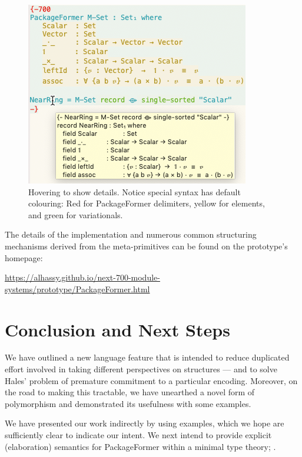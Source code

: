 \documentclass[sigplan,screen]{acmart}
\begin{document}
\begin{figure}[htbp]
\centering
\includegraphics[width=.9\linewidth]{./Paper0_MousingOverLarge.png}
\caption{Hovering to show details. Notice special syntax has default colouring: Red for \textsf{PackageFormer} delimiters, yellow for elements, and green for variationals. \label{mousing-over}}
\end{figure}

\noindent
The details of the implementation and numerous common structuring mechanisms
derived from the meta-primitives can be found on the prototype's homepage:
\begin{center}
\url{https://alhassy.github.io/next-700-module-systems/prototype/PackageFormer.html}
\end{center}

\section{Conclusion and Next Steps}
\label{sec:org42edb19}
We have outlined a new language feature that is intended to reduce
duplicated effort involved in taking different perspectives on structures --- and to solve
Hales' problem of premature commitment to a particular encoding. Moreover, on the road
to making this tractable, we have unearthed a novel form of polymorphism and demonstrated
its usefulness with some examples.

We have presented our work indirectly by using examples, which we
hope are sufficiently clear to indicate our intent. We next intend to
provide explicit (elaboration) semantics for \textsf{PackageFormer} within a
minimal type theory; \cite{types_for_modules}.
\end{document}
